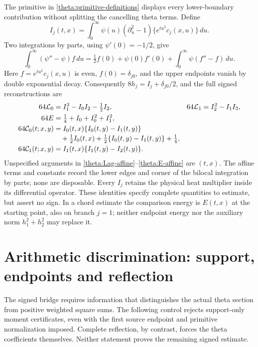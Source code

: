 \documentclass[11pt]{article}
\numberwithin{equation}{section}
\theoremstyle{definition}
\theoremstyle{remark}
\newcommand{\Ephys}{E}
\begin{document}
The primitive in \eqref{theta:primitive-definitions} displays every
lower-boundary contribution without splitting the cancelling theta
terms.  Define
\begin{equation}
 I_j(t,x)=\int_0^\infty\psi(u)
       (\partial_u^2-1)\{e^{tu^2}c_j(x,u)\}\,du.
 \label{theta:primitive-I}
\end{equation}
Two integrations by parts, using $\psi'(0)=-1/2$, give
\[
 \int_0^\infty(\psi''-\psi)f\,du
 =\tfrac12 f(0)+\psi(0)f'(0)
      +\int_0^\infty\psi(f''-f)\,du.
\]
Here $f=e^{tu^2}c_j(x,u)$ is even, $f(0)=\delta_{j0}$, and the
upper endpoints vanish by double exponential decay.  Consequently
$8h_j=I_j+\delta_{j0}/2$, and the full signed reconstructions are
\begin{align}
 64\mathcal L_0&=I_1^2-I_0I_2-\tfrac12 I_2,&
 64\mathcal L_1&=I_2^2-I_1I_3,\label{theta:Lag-affine}\\
 64\Ephys&=\tfrac14+I_0+I_0^2+I_1^2,&&\label{theta:E-affine}\\
 64\mathcal C_0(t;x,y)
 &=I_0(t,x)\{I_0(t,y)-I_1(t,y)\}
 \notag\\[-2pt]
 &\quad+\tfrac12 I_0(t,x)
       +\tfrac12\{I_0(t,y)-I_1(t,y)\}+\tfrac14,
 &&\label{theta:C0-affine}\\
 64\mathcal C_1(t;x,y)
 &=I_1(t,x)\{I_1(t,y)-I_2(t,y)\}.&&\label{theta:C1-affine}
\end{align}
Unspecified arguments in \eqref{theta:Lag-affine}--\eqref{theta:E-affine}
are $(t,x)$.  The affine terms and constants record the lower edges and
corner of the bilocal integration by parts; none are disposable.
Every $I_j$ retains the physical heat multiplier inside its differential
operator.  These identities specify complete quantities to estimate,
but assert no sign.  In a chord estimate the comparison energy is
$\Ephys(t,x)$ at the starting point, also on branch $j=1$; neither
endpoint energy nor the auxiliary norm $h_1^2+h_2^2$ may replace it.

\section{Arithmetic discrimination: support, endpoints and reflection}
\label{arith:discrimination}

The signed bridge requires information that distinguishes the actual theta
section from positive weighted square sums.  The following control rejects
support-only moment certificates, even with the first source endpoint and
primitive normalization imposed.  Complete reflection, by contrast, forces
the theta coefficients themselves.  Neither statement proves the remaining
signed estimate.
\end{document}
